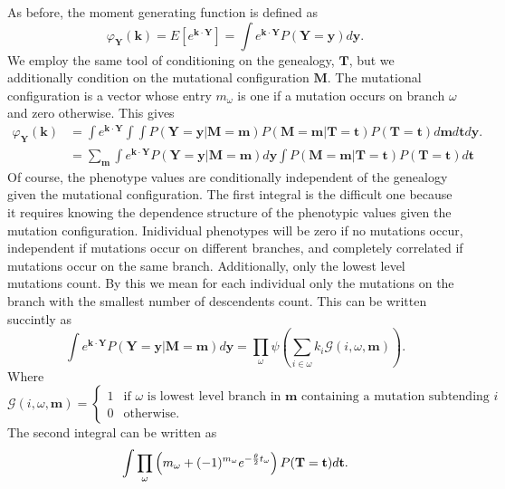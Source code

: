 As before, the moment generating function is defined as 
\begin{equation}
  \varphi_{\mathbf{Y}}(\mathbf{k}) = E\left[ e^{\mathbf{k} \cdot \mathbf{Y}} \right] = 
  \int e^{\mathbf{k} \cdot \mathbf{Y}} P(\mathbf{Y}=\mathbf{y}) d\mathbf{y}.
\end{equation}
We employ the same tool of conditioning on the genealogy, $\mathbf{T}$, but we
additionally condition on the mutational configuration $\mathbf{M}$. The
mutational configuration is a vector whose entry $m_{\omega}$ is one if a
mutation occurs on branch $\omega$ and zero otherwise. This gives
\begin{align}
  \varphi_{\mathbf{Y}}(\mathbf{k}) &= \int e^{\mathbf{k} \cdot \mathbf{Y}}
  \int \int P(\mathbf{Y}=\mathbf{y} | \mathbf{M}=\mathbf{m}) 
  P(\mathbf{M}=\mathbf{m} | \mathbf{T}=\mathbf{t}) P(\mathbf{T}=\mathbf{t})
  d\mathbf{m} d\mathbf{t} d\mathbf{y}.\\
  &= \sum_{\mathbf{m}} \int e^{\mathbf{k} \cdot \mathbf{Y}} P(\mathbf{Y}=\mathbf{y} | \mathbf{M}=\mathbf{m}) d\mathbf{y} 
  \int P(\mathbf{M}=\mathbf{m}|\mathbf{T}=\mathbf{t}) P(\mathbf{T}=\mathbf{t})d\mathbf{t}
\end{align}
Of course, the phenotype values are conditionally independent of the genealogy
given the mutational configuration. The first integral is the difficult one
because it requires knowing the dependence structure of the phenotypic values
given the mutation configuration. Inidividual phenotypes will be zero if no
mutations occur, independent if mutations occur on different branches, and
completely correlated if mutations occur on the same branch. Additionally, only
the lowest level mutations count. By this we mean for each individual only the
mutations on the branch with the smallest number of descendents count. This can
be written succintly as
\begin{equation}
  \int e^{\mathbf{k} \cdot \mathbf{Y}} P(\mathbf{Y}=\mathbf{y} | \mathbf{M}=\mathbf{m}) d\mathbf{y} = 
  \prod_{\omega} \psi\left(\sum_{i \in \omega} k_i \mathscr{G}(i, \omega, \mathbf{m}) \right).
\end{equation}
Where 
\[
 \mathscr{G}(i,\omega,\mathbf{m}) = 
 \begin{cases}
   1 & \text{if }\omega\text{ is lowest level branch in }\mathbf{m}\text{ containing a mutation subtending }i\\
   0 & \text{otherwise}.
 \end{cases}
\]
The second integral can be written as
\begin{equation}
  \int \prod_\omega \left( m_\omega + (-1)^{m_\omega}e^{-\frac{\theta}{2} t_\omega}\right)P(\mathbf{T}=\mathbf{t})d\mathbf{t}.
\end{equation}
